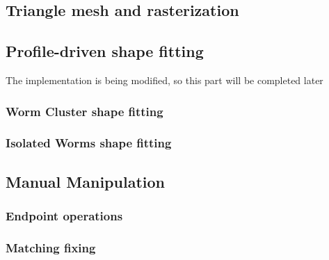 \subsection{Triangle mesh and rasterization}
\label{sec:metrast}


\subsection{Profile-driven shape fitting}
\label{sec:metfit}

\begin{Large}
The implementation is being modified, so this part will be completed later 
\end{Large}



\subsubsection{Worm Cluster shape fitting}
\label{sec:clusterfit}
\subsubsection{Isolated Worms shape fitting}
\label{sec:metiso}

\subsection{Manual Manipulation}
\subsubsection{Endpoint operations}
\label{sec:endpointop}
\subsubsection{Matching fixing}
\label{sec:matchfix}
